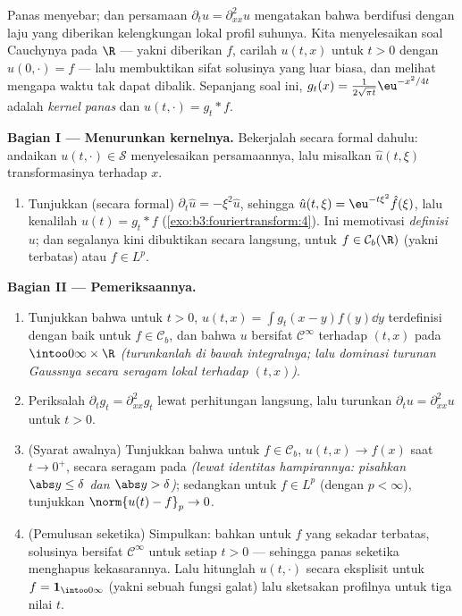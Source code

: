 \begin{problem}[{Soal akhir pekan --- $\partial_tu =
\partial^2_{xx}u$, yang diselesaikan sampai tuntas}]
\label{pb:b3:fouriertransform:1}
Panas menyebar; dan persamaan $\partial_tu = \partial_{xx}^2u$
mengatakan bahwa  berdifusi dengan laju yang diberikan kelengkungan
lokal profil suhunya. Kita menyelesaikan soal Cauchynya
pada $\R$ --- yakni diberikan $f$, carilah $u(t, x)$ untuk $t > 0$ dengan
$u(0, \cdot) = f$ --- lalu membuktikan sifat solusinya yang
luar biasa, dan melihat mengapa waktu tak dapat dibalik. Sepanjang soal ini,
$g_t(x) = \frac1{2\sqrt{\pi t}}\eu^{-x^2/4t}$ adalah
\emph{kernel panas} dan $u(t, \cdot) = g_t *
f$.

\medskip
\noindent\textbf{Bagian I --- Menurunkan kernelnya.} Bekerjalah
secara formal dahulu: andaikan $u(t, \cdot) \in \mathcal S$ menyelesaikan
persamaannya, lalu misalkan $\hat u(t, \xi)$ transformasinya terhadap
$x$.
\begin{enumerate}
  \item Tunjukkan (secara formal) $\partial_t\hat u = -\xi^2\hat u$,
        sehingga $\hat u(t,\xi) = \eu^{-t\xi^2}\hat f(\xi)$, lalu
        kenalilah $u(t) = g_t * f$
        (\cref{exo:b3:fouriertransform:4}). Ini memotivasi
        \emph{definisi} $u$; dan segalanya kini dibuktikan
        secara langsung, untuk $f \in \mathcal C_b(\R)$ (yakni 
        terbatas) atau $f \in L^p$.
\end{enumerate}

\medskip
\noindent\textbf{Bagian II --- Pemeriksaannya.}
\begin{enumerate}[resume]
  \item Tunjukkan bahwa untuk $t > 0$, $u(t, x) = \int
        g_t(x-y)f(y)\dd y$ terdefinisi dengan baik untuk $f \in \mathcal
        C_b$, dan bahwa $u$ bersifat $\mathcal C^\infty$ terhadap $(t, x)$
        pada $\intoo0\infty\times\R$ \emph{(turunkanlah di bawah
        integralnya; lalu dominasi turunan Gaussnya secara seragam lokal terhadap $(t,x)$)}.
  \item Periksalah $\partial_tg_t = \partial^2_{xx}g_t$ lewat perhitungan
        langsung, lalu turunkan $\partial_tu =
        \partial^2_{xx}u$ untuk $t > 0$.
  \item (Syarat awalnya) Tunjukkan bahwa untuk $f \in \mathcal
        C_b$, $u(t, x) \to f(x)$ saat $t \to 0^+$, secara seragam pada
         \emph{(lewat identitas hampirannya: pisahkan $\abs y
        \leq \delta$ dan $\abs y > \delta$)}; sedangkan untuk $f \in L^p$
        (dengan $p < \infty$), tunjukkan $\norm{u(t) - f}_p \to 0$.
  \item (Pemulusan seketika) Simpulkan: bahkan untuk $f$ yang sekadar
         terbatas, solusinya bersifat $\mathcal C^\infty$
        untuk setiap $t > 0$ --- sehingga panas seketika menghapus
        kekasarannya. Lalu hitunglah $u(t, \cdot)$ secara eksplisit untuk $f =
        \mathbf 1_{\intoo0\infty}$ (yakni sebuah fungsi galat) lalu
        sketsakan profilnya untuk tiga nilai $t$.
\end{enumerate}


\end{problem}
